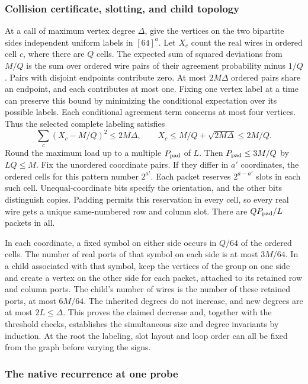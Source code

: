 \documentclass[
  11pt,
]{article}
\begin{document}
\subsubsection*{Collision certificate, slotting, and child topology}

At a call of maximum vertex degree \(\Delta\), give the vertices on
the two bipartite sides independent uniform labels in \([64]^a\).
Let \(X_c\) count the real wires in ordered cell \(c\), where
there are \(Q\) cells. The expected sum of squared deviations from
\(M/Q\) is the sum over ordered wire pairs of their agreement
probability minus \(1/Q\). Pairs with disjoint endpoints contribute
zero. At most \(2M\Delta\) ordered pairs share an endpoint, and
each contributes at most one. Fixing one vertex label at a time
can preserve this bound by minimizing the conditional expectation
over its possible labels. Each conditional agreement term concerns
at most four vertices. Thus the selected complete labeling satisfies
\[
    \sum_c (X_c-M/Q)^2\le 2M\Delta,
       \qquad X_c\le M/Q+\sqrt{2M\Delta}\le 2M/Q .
\]
Round the maximum load up to a multiple \(P_{\rm pad}\) of \(L\).
Then \(P_{\rm pad}\le3M/Q\) by \(LQ\le M\).
Fix the unordered coordinate pairs. If they differ in \(a'\)
coordinates, the ordered cells for this pattern number \(2^{a'}\).
Each packet reserves \(2^{a-a'}\) slots in each such cell.
Unequal-coordinate bits specify the orientation, and the other
bits distinguish copies. Padding permits this reservation in
every cell, so every real wire gets a unique same-numbered row and
column slot. There are \(Q P_{\rm pad}/L\) packets in all.

In each coordinate, a fixed symbol on either side occurs in \(Q/64\)
of the ordered cells. The number of real ports of that symbol on
each side is at most \(3M/64\). In a child associated with that
symbol, keep the vertices of the group on one side and create a
vertex on the other side for each packet, attached to its retained
row and column ports. The child's number of wires is the number of
these retained ports, at most \(6M/64\). The inherited degrees do
not increase, and new degrees are at most \(2L\le\Delta\).
This proves the claimed decrease and, together with the threshold
checks, establishes the simultaneous size and degree invariants by
induction. At the root the labeling, slot layout and loop order can
all be fixed from the graph before varying the signs.

\subsubsection*{The native recurrence at one probe}
\end{document}
